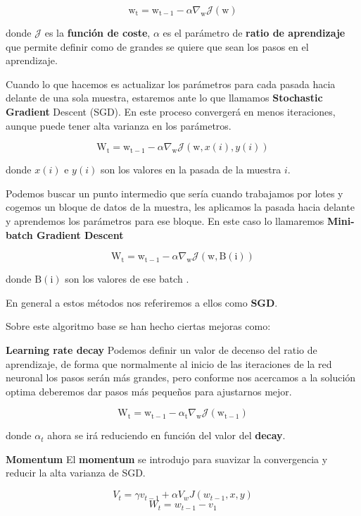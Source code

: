 \documentclass[
  a4paper,
  DIV=11,
  numbers=noendperiod]{scrreprt}
\begin{document}
\[\mathrm{w}_{\mathrm{t}}=\mathrm{w}_{\mathrm{t}-1}-\alpha \nabla_{\mathrm{w}} \mathcal{J}(\mathrm{w})\]

donde \(\mathcal{J}\) es la \textbf{función de coste}, \(\alpha\) es el
parámetro de \textbf{ratio de aprendizaje} que permite definir como de
grandes se quiere que sean los pasos en el aprendizaje.

Cuando lo que hacemos es actualizar los parámetros para cada pasada
hacia delante de una sola muestra, estaremos ante lo que llamamos
\textbf{Stochastic Gradient} Descent (SGD). En este proceso convergerá
en menos iteraciones, aunque puede tener alta varianza en los
parámetros.

\[\mathrm{W}_{\mathrm{t}}=\mathrm{w}_{\mathrm{t}-1}-\alpha \nabla_{\mathrm{w}} \mathcal{J}(\mathrm{w}, x(i),y(i))\]

donde \(x(i)\) e \(y(i)\) son los valores en la pasada de la muestra
\(i\).

Podemos buscar un punto intermedio que sería cuando trabajamos por lotes
y cogemos un bloque de datos de la muestra, les aplicamos la pasada
hacia delante y aprendemos los parámetros para ese bloque. En este caso
lo llamaremos \textbf{Mini-batch Gradient Descent}

\[\mathrm{W}_{\mathrm{t}}=\mathrm{w}_{\mathrm{t}-1}-\alpha \nabla_{\mathrm{w}} \mathcal{J}(\mathrm{w}, \mathrm{B}(\mathrm{i}))\]

donde \(\mathrm{B}(\mathrm{i})\) son los valores de ese batch .

En general a estos métodos nos referiremos a ellos como \textbf{SGD}.

Sobre este algoritmo base se han hecho ciertas mejoras como:

\textbf{Learning rate decay} Podemos definir un valor de decenso del
ratio de aprendizaje, de forma que normalmente al inicio de las
iteraciones de la red neuronal los pasos serán más grandes, pero
conforme nos acercamos a la solución optima deberemos dar pasos más
pequeños para ajustarnos mejor.

\[\mathrm{W}_{\mathrm{t}}=\mathrm{w}_{\mathrm{t}-1}-\alpha_{\mathrm{t}} \nabla_{\mathrm{w}} \mathcal{J}\left(\mathrm{w}_{\mathrm{t}-1}\right)\]

donde \(\alpha _t\) ahora se irá reduciendo en función del valor del
\textbf{decay}.

\textbf{Momentum} El \textbf{momentum} se introdujo para suavizar la
convergencia y reducir la alta varianza de SGD.

\[ V_ {t}  =  \gamma   v_ {t-1}  +  \alpha  V_ {w} J(  w_ {t-1}  ,x,y)\]
\[ W_ {t} =  w_ {t-1}  -  v_ {1} \]
\end{document}
